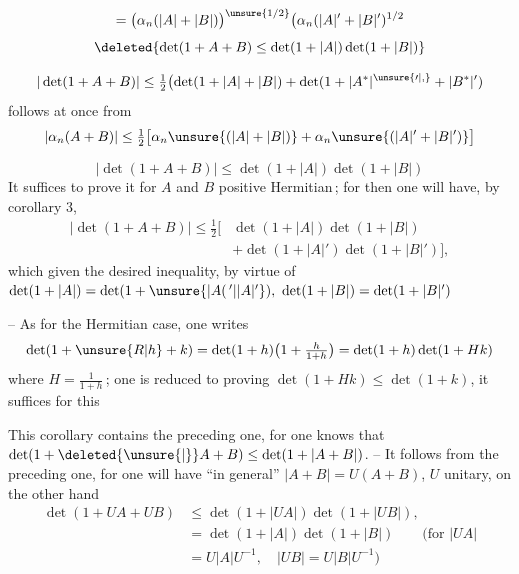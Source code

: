 \[
=\bigl(\alpha_n(|A|+|B|)\bigr)^{\unsure{1/2}}\bigl(\alpha_n(|A|'+|B|')^{1/2}
\]
\[
\deleted{\det(1+A+B)\leq\det(1+|A|)\det(1+|B|)}
\]

\[
|\det(1+A+B)|\leq\tfrac12\bigl(\det(1+|A|+|B|)+\det(1+|A^*|^{\unsure{\prime|,}}+|B^*|')\bigr.
\]
follows at once from
\[
|\alpha_n(A+B)|\leq\tfrac12\bigl[\alpha_n\unsure{(|A|+|B|)}+\alpha_n\unsure{(|A|'+|B|')}\bigr]
\]

\[
\boxed{|\det(1+A+B)|\leq\det(1+|A|)\det(1+|B|)}
\]
It suffices to  prove it for $A$ and $B$
positive Hermitian\,; for then one will have, by
corollary 3,
\[
\begin{aligned}
|\det(1+A+B)|\leq\tfrac12\bigl[&\det(1+|A|)\det(1+|B|)\\
&+\det(1+|A|')\det(1+|B|')\bigr],
\end{aligned}
\]
which given the desired inequality, by virtue of
$\det(1+|A|)=\det(1+\unsure{\lvert A(\,{}'|\lvert A\rvert'}),\ \det(1+|B|)=\det(1+|B|')$

-- As for the  Hermitian case, one writes
\[
\det(1+\unsure{R|h}+k)=\det(1+h)\bigl(1+\tfrac{h}{1+h}\bigr)=\det(1+h)\det(1+Hk)
\]
where $H=\frac{1}{1+h}$\,; one is reduced to proving
$\det(1+Hk)\leq\det(1+k)$, it suffices for this

This corollary contains the preceding one, for one knows
that $\det(1+\deleted{\unsure{|}}A+B)\leq\det(1+|A+B|)$. -- It
follows from the preceding one, for one will have ``in general''
$|A+B|=U(A+B)$, $U$ unitary, on the other hand
\[
\begin{aligned}
\det(1+UA+UB)&\leq\det(1+|UA|)\det(1+|UB|),\\
&=\det(1+|A|)\det(1+|B|)\qquad(\text{for } |UA|\\
&=U|A|U^{-1},\quad |UB|=U|B|U^{-1})
\end{aligned}
\]
